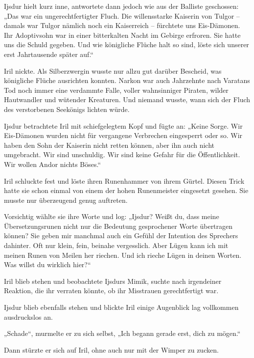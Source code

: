 Ijsdur hielt kurz inne, antwortete dann jedoch wie aus der Balliste geschossen: „Das war ein ungerechtfertigter Fluch. Die willensstarke Kaiserin von Tulgor – damals war Tulgor nämlich noch ein Kaiserreich – fürchtete uns Eis-Dämonen. Ihr Adoptivsohn war in einer bitterkalten Nacht im Gebirge erfroren. Sie hatte uns die Schuld gegeben. Und wie königliche Flüche halt so sind, löste sich unserer erst Jahrtausende später auf.“

Iril nickte. Als Silberzwergin wusste nur allzu gut darüber Bescheid, was königliche Flüche ausrichten konnten. Narkon war auch Jahrzehnte nach Varatans Tod noch immer eine verdammte Falle, voller wahnsinniger Piraten, wilder Hautwandler und wütender Kreaturen. Und niemand wusste, wann sich der Fluch des verstorbenen Seekönigs lichten würde.

Ijsdur betrachtete Iril mit schiefgelegtem Kopf und fügte an: „Keine Sorge. Wir Eis-Dämonen wurden nicht für vergangene Verbrechen eingesperrt oder so. Wir haben den Sohn der Kaiserin nicht retten können, aber ihn auch nicht umgebracht. Wir sind unschuldig. Wir sind keine Gefahr für die Öffentlichkeit. Wir wollen Andor nichts Böses.“

Iril schluckte fest und löste ihren Runenhammer von ihrem Gürtel. Diesen Trick hatte sie schon einmal von einem der hohen Runenmeister eingesetzt gesehen. Sie musste nur überzeugend genug auftreten.

Vorsichtig wählte sie ihre Worte und log: „Ijsdur? Weißt du, dass meine Übersetzungsrunen nicht nur die Bedeutung gesprochener Worte übertragen können? Sie geben mir manchmal auch ein Gefühl der Intention des Sprechers dahinter. Oft nur klein, fein, beinahe vergesslich. Aber Lügen kann ich mit meinen Runen von Meilen her riechen. Und ich rieche Lügen in deinen Worten. Was willst du wirklich hier?“

Iril blieb stehen und beobachtete Ijsdurs Mimik, suchte nach irgendeiner Reaktion, die ihr verraten könnte, ob ihr Misstrauen gerechtfertigt war.

Ijsdur blieb ebenfalls stehen und blickte Iril einige Augenblick lag vollkommen ausdruckslos an.

„Schade“, murmelte er zu sich selbst, „Ich begann gerade erst, dich zu mögen.“

Dann stürzte er sich auf Iril, ohne auch nur mit der Wimper zu zucken.\bigskip







